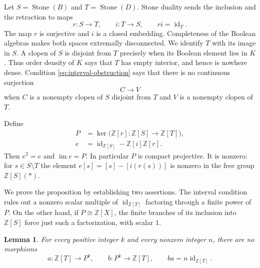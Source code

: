 \documentclass[11pt]{article}
\newtheorem{lemma}[theorem]{Lemma}
\theoremstyle{definition}
\theoremstyle{remark}
\newcommand{\Z}{\mathbb Z}
\newcommand{\Stone}{\operatorname{Stone}}
\newcommand{\id}{\operatorname{id}}
\begin{document}
Let $S=\Stone(B)$ and $T=\Stone(D)$. Stone duality sends the inclusion
and the retraction to maps
\[
 r:S\longrightarrow T,\qquad i:T\longrightarrow S,
 \qquad r i=\id_T.
\]
The map $r$ is surjective and $i$ is a closed embedding. Completeness
of the Boolean algebras makes both spaces extremally disconnected.
We identify $T$ with its image in $S$. A clopen of $S$ is disjoint
from $T$ precisely when its Boolean element lies in $K$. Thus order
density of $K$ says that $T$ has empty interior, and hence is nowhere
dense. Condition \eqref{eq:interval-obstruction} says that there is
no continuous surjection
\begin{equation}
\label{eq:topological-obstruction}
 C\longrightarrow V
\end{equation}
when $C$ is a nonempty clopen of $S$ disjoint from $T$ and $V$ is a
nonempty clopen of $T$.

Define
\begin{equation}
\label{eq:projective-kernel}
 \begin{aligned}
 P&=\ker\bigl(\Z[r]:\Z[S]\to\Z[T]\bigr),\\
 e&=\id_{\Z[S]}-\Z[i]\Z[r].
 \end{aligned}
\end{equation}
Then $e^2=e$ and $\operatorname{im}e=P$. In particular $P$ is compact
projective. It is nonzero: for $s\in S\setminus T$ the element
$e[s]=[s]-[i(r(s))]$ is nonzero in the free group $\Z[S](*)$.

We prove the proposition by establishing two assertions. The interval
condition rules out a nonzero scalar multiple of $\id_{\Z[T]}$
factoring through a finite power of $P$. On the other hand, if
$P\cong\Z[X]$, the finite branches of its inclusion into $\Z[S]$
force just such a factorization, with scalar $1$.

\begin{lemma}
\label{lem:no-scalar-factorization}
For every positive integer $k$ and every nonzero integer $n$, there
are no morphisms
\[
 a:\Z[T]\longrightarrow P^k,\qquad
 b:P^k\longrightarrow\Z[T],\qquad ba=n\id_{\Z[T]}.
\]
\end{lemma}
\end{document}
